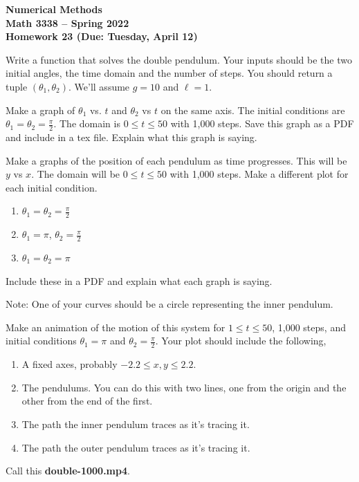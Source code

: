 \documentclass[11pt,letterpaper]{article}
\newcommand{\semester}{Spring 2022}
\newcommand{\due}{Tuesday, April 12}
\begin{document}
\newpage

\begin{center}
{\huge{\bf  Numerical Methods}} \\[1.5ex]
{\bf Math 3338 -- \semester}\\[1.5ex]
{\Large{\bf Homework 23 (Due: \due)}}\\
\end{center}
\vspace{2mm}

\begin{problem}
 Write a function that solves the double pendulum. Your inputs should be the two initial angles,
the time domain and the number of steps. You should return a tuple $(\theta_1,\theta_2)$. We'll
assume $g=10$ and $\ell=1$.
\end{problem}


\begin{problem}
 Make a graph of $\theta_1$ vs. $t$ and $\theta_2$ vs $t$ on the same axis. The initial conditions
are $\theta_1=\theta_2=\frac{\pi}{2}$. The domain is 
$0\le t\le 50$ with 1,000 steps. Save this graph as a PDF and include in a tex file. Explain what
this graph is saying.
\end{problem}


\begin{problem}
 Make a graphs of the position of each pendulum as time progresses. This will be $y$ vs $x$. The 
domain will be $0\le t\le 50$ with 1,000 steps. Make a different plot for each initial condition.
\begin{enumerate}
 \item $\theta_1 = \theta_2 = \frac{\pi}{2}$
 \item $\theta_1 = \pi$, $\theta_2 = \frac{\pi}{2}$
 \item $\theta_1 = \theta_2 = \pi$
\end{enumerate}
Include these in a PDF and explain what each graph is saying.

Note: One of your curves should be a circle representing the inner pendulum.
\end{problem}


\begin{problem}
 Make an animation of the motion of this system for $1\le t\le 50$, 1,000 steps, and initial conditions
$\theta_1 = \pi$ and $\theta_2=\frac{\pi}{2}$. Your plot should include the following,
\begin{enumerate}
 \item A fixed axes, probably $-2.2\le x,y\le 2.2$.
 \item The pendulums. You can do this with two lines, one from the origin and the other from the
end of the first.
 \item The path the inner pendulum traces as it's tracing it.
 \item The path the outer pendulum traces as it's tracing it.
\end{enumerate}
Call this \textbf{double-1000.mp4}.
\end{problem}
\end{document}
